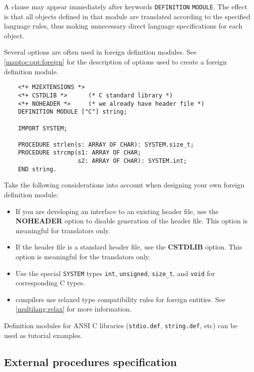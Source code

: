A 
clause may appear immediately after keywords \verb'DEFINITION'
\verb'MODULE'. The effect is that all objects defined in
that module are translated according to the specified
language rules, thus making unnecessary direct language
specifications for each object.

Several options are often used in foreign definition modules.
\ifgenc
See \ref{maptoc:opt:foreign} for the
description of options used to create a foreign definition module.
\fi

\Example
\begin{verbatim}
    <*+ M2EXTENSIONS *>
    <*+ CSTDLIB *>      (* C standard library *)
    <*+ NOHEADER *>     (* we already have header file *)
    DEFINITION MODULE ["C"] string;

    IMPORT SYSTEM;

    PROCEDURE strlen(s: ARRAY OF CHAR): SYSTEM.size_t;
    PROCEDURE strcmp(s1: ARRAY OF CHAR;
                     s2: ARRAY OF CHAR): SYSTEM.int;
    END string.
\end{verbatim}

Take the following considerations into account when designing
your own foreign definition module:
\begin{itemize}
\item
        If you are developing an interface to an existing header file,
        use the {\bf NOHEADER} option to disable generation of the header
        file.  This option is meaningful for translators only.
\item
        If the header file is a standard header file, use the
        {\bf CSTDLIB} option. This option is meaningful for the translators
        only.
\item
        Use the special \verb'SYSTEM' types {\tt int}, {\tt unsigned},
        \verb|size_t|, and {\tt void} for corresponding
        C types.
\item
        \xds{} compilers use relaxed type compatibility rules
        for foreign entities. See \ref{multilang:relax} for
        more information.

\end{itemize}
\ifgenc
Definition modules for ANSI C libraries ({\tt stdio.def},
{\tt string.def}, etc) can be used as tutorial examples.
\fi

\subsection{External procedures specification}
\label{multilang:extproc}

